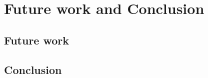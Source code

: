 \chapter{Future work and Conclusion\label{chap:conclusion}}

    \section{Future work\label{sec:futurework}}
        
        
        
    \section{Conclusion\label{sec:conclusion}}